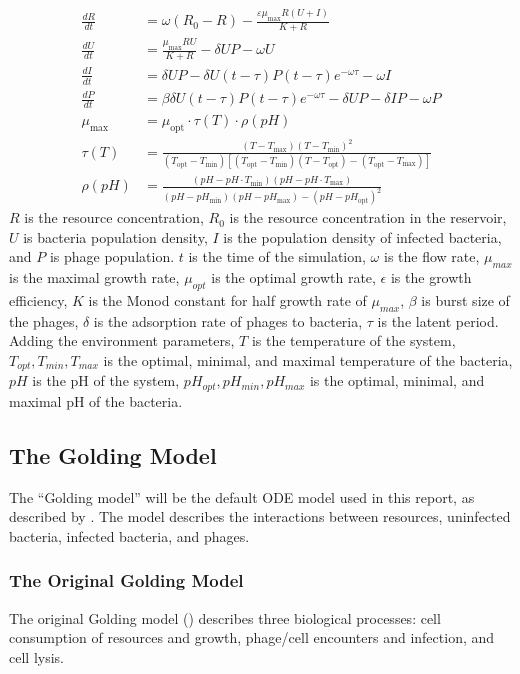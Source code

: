 \begin{align*}
    \frac{dR}{dt} &= \omega (R_0 - R) - \frac{\varepsilon \mu_{\text{max}} R(U + I)}{K + R} \\
    \frac{dU}{dt} &= \frac{\mu_{\text{max}} RU}{K + R} - \delta UP - \omega U \\
    \frac{dI}{dt} &= \delta UP - \delta U(t - \tau) P(t - \tau) e^{-\omega \tau} - \omega I \\
    \frac{dP}{dt} &= \beta \delta U(t - \tau) P(t - \tau) e^{-\omega \tau} - \delta UP - \delta IP - \omega P\\
        \mu_{\text{max}} &= \mu_{\text{opt}} \cdot \tau(T) \cdot \rho(pH) \\
    \tau(T) &= \frac{(T - T_{\text{max}})(T - T_{\text{min}})^2}{(T_{\text{opt}} - T_{\text{min}})\left[(T_{\text{opt}} - T_{\text{min}})(T - T_{\text{opt}}) - (T_{\text{opt}} - T_{\text{max}})\right]} \\
    \rho(pH) &= \frac{(pH - pH\cdot T_{\text{min}})(pH - pH\cdot T_{\text{max}})}{(pH - pH_{\text{min}})(pH - pH_{\text{max}}) - (pH - pH_{\text{opt}})^2}
\end{align*}
$R$ is the resource concentration, $R_0$ is the resource concentration in the reservoir, $U$ is bacteria population density, $I$ is the population density of infected bacteria, and $P$ is phage population. 
$t$ is the time of the simulation, $\omega$ is the flow rate, $\mu_{max}$ is the maximal growth rate, $\mu_{opt}$ is the optimal growth rate, $\epsilon$ is the growth efficiency, $K$ is the Monod constant for half growth rate of $\mu_{max}$, $\beta$ is burst size of the phages, $\delta$ is the adsorption rate of phages to bacteria, $\tau$ is the latent period. 
Adding the environment parameters, $T$ is the temperature of the system, $T_{opt}, T_{min}, T_{max}$ is the optimal, minimal, and maximal temperature of the bacteria, $pH$ is the pH of the system, $pH_{opt}, pH_{min}, pH_{max}$ is the optimal, minimal, and maximal pH of the bacteria. 

\subsection{The Golding Model}
\label{sec:golding_model}
The “Golding model” will be the default ODE model used in this report, as described by \citet{gengUsingBacterialPopulation2024}. 
The model describes the interactions between resources, uninfected bacteria, infected bacteria, and phages. 

\subsubsection{The Original Golding Model}
The original Golding model () describes three biological processes: cell consumption of resources and growth, phage/cell encounters and infection, and cell lysis. 

